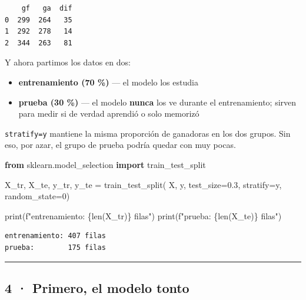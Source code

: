 \documentclass[
]{article}
\newenvironment{Shaded}{}{}
\newcommand{\BuiltInTok}[1]{\textcolor[rgb]{0.00,0.50,0.00}{#1}}
\newcommand{\DecValTok}[1]{\textcolor[rgb]{0.25,0.63,0.44}{#1}}
\newcommand{\FloatTok}[1]{\textcolor[rgb]{0.25,0.63,0.44}{#1}}
\newcommand{\ImportTok}[1]{\textcolor[rgb]{0.00,0.50,0.00}{\textbf{#1}}}
\newcommand{\NormalTok}[1]{#1}
\newcommand{\OperatorTok}[1]{\textcolor[rgb]{0.40,0.40,0.40}{#1}}
\newcommand{\SpecialCharTok}[1]{\textcolor[rgb]{0.25,0.44,0.63}{#1}}
\newcommand{\SpecialStringTok}[1]{\textcolor[rgb]{0.73,0.40,0.53}{#1}}
\providecommand{\tightlist}{%
  \setlength{\itemsep}{0pt}\setlength{\parskip}{0pt}}
\begin{document}
\begin{verbatim}
    gf   ga  dif
0  299  264   35
1  292  278   14
2  344  263   81
\end{verbatim}

\protect{}\label{Gxj2l4cfnYyR}
Y ahora partimos los datos en dos:

\begin{itemize}
\tightlist
\item
  \textbf{entrenamiento (70 \%)} --- el modelo los estudia
\item
  \textbf{prueba (30 \%)} --- el modelo \textbf{nunca} los ve durante el
  entrenamiento; sirven para medir si de verdad aprendió o solo memorizó
\end{itemize}

\texttt{stratify=y} mantiene la misma proporción de ganadoras en los dos
grupos. Sin eso, por azar, el grupo de prueba podría quedar con muy
pocas.

\protect{}\label{SoeK6j6PnYyS}
\begin{Shaded}
\begin{Highlighting}[]
\ImportTok{from}\NormalTok{ sklearn.model\_selection }\ImportTok{import}\NormalTok{ train\_test\_split}

\NormalTok{X\_tr, X\_te, y\_tr, y\_te }\OperatorTok{=}\NormalTok{ train\_test\_split(}
\NormalTok{    X, y, test\_size}\OperatorTok{=}\FloatTok{0.3}\NormalTok{, stratify}\OperatorTok{=}\NormalTok{y, random\_state}\OperatorTok{=}\DecValTok{0}\NormalTok{)}

\BuiltInTok{print}\NormalTok{(}\SpecialStringTok{f"entrenamiento: }\SpecialCharTok{\{}\BuiltInTok{len}\NormalTok{(X\_tr)}\SpecialCharTok{\}}\SpecialStringTok{ filas"}\NormalTok{)}
\BuiltInTok{print}\NormalTok{(}\SpecialStringTok{f"prueba:        }\SpecialCharTok{\{}\BuiltInTok{len}\NormalTok{(X\_te)}\SpecialCharTok{\}}\SpecialStringTok{ filas"}\NormalTok{)}
\end{Highlighting}
\end{Shaded}

\begin{verbatim}
entrenamiento: 407 filas
prueba:        175 filas
\end{verbatim}

\protect{}\label{OwgEQubunYyS}
\begin{center}\rule{0.5\linewidth}{0.5pt}\end{center}

\subsection{4 · Primero, el modelo
tonto}\label{4--primero-el-modelo-tonto}
\end{document}
